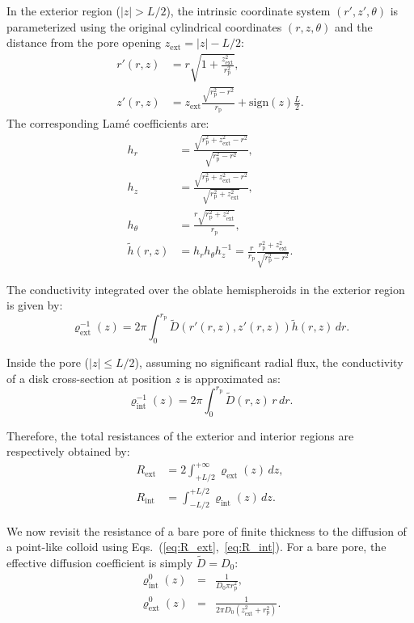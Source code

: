 \documentclass[10pt, a4paper, twocolumn]{article}
\begin{document}
In the exterior region ($|z| > L/2$), the intrinsic coordinate system $(r', z', \theta)$ is parameterized using the original cylindrical coordinates $(r,z,\theta)$ and the distance from the pore opening $z_{\text{ext}} = |z| - L/2$:
\begin{align}
    r'(r,z) &= r\sqrt{1 + \frac{z_{\text{ext}}^2}{r_{\text{p}}^2}},\\[4pt]
    z'(r,z) &= z_{\text{ext}}\frac{\sqrt{r_{\text{p}}^2 - r^2}}{r_{\text{p}}} + \text{sign}(z)\frac{L}{2}.
\end{align}
The corresponding Lam\'e  coefficients are:
\begin{align}
    h_r &= \frac{\sqrt{r_{\text{p}}^2 + z_{\text{ext}}^2 - r^2}}{\sqrt{r_{\text{p}}^2 - r^2}},\\[4pt]
    h_z &= \frac{\sqrt{r_{\text{p}}^2 + z_{\text{ext}}^2 - r^2}}{\sqrt{r_{\text{p}}^2 + z_{\text{ext}}^2}},\\[4pt]
    h_{\theta} &= \frac{r\sqrt{r_{\text{p}}^2 + z_{\text{ext}}^2}}{r_{\text{p}}},\\[4pt]
    \tilde{h}(r,z) &= h_r h_{\theta} h_z^{-1} = \frac{r}{r_{\text{p}}}\frac{r_{\text{p}}^2 + z_{\text{ext}}^2}{\sqrt{r_{\text{p}}^2 - r^2}}.
\end{align}

The conductivity integrated over the oblate hemispheroids in the exterior region is given by:
\begin{equation}
  \label{eq:rho_ext}
  \varrho_{\text{ext}}^{-1}(z)= 2\pi\int_{0}^{r_{\text{p}}^{}} 
  \tilde{D}\left( r'(r,z), z'(r,z) \right)\tilde{h}(r,z)\,dr.
\end{equation}

Inside the pore ($|z|\leq L/2$), assuming no significant radial flux, the conductivity of a disk cross-section at position $z$ is approximated as:
\begin{equation}
  \varrho_{\text{int}}^{-1}(z)= 2\pi\int_{0}^{r_{\text{p}}^{}} \tilde{D}(r,z)\,r\,dr.
\end{equation}

Therefore, the total resistances of the exterior and interior regions are respectively obtained by:
\begin{align}
   \label{eq:R_ext}
   R_{\text{ext}} &=2\int_{+L/2}^{+\infty}\varrho_{\text{ext}}(z)\,dz,\\[5pt]
   \label{eq:R_int}
   R_{\text{int}} &=\int_{-L/2}^{+L/2}\varrho_{\text{int}}(z)\,dz.
\end{align}

We now revisit the resistance of a bare pore of finite thickness to the diffusion of a point-like colloid using Eqs.~(\ref{eq:R_ext},~\ref{eq:R_int}).
For a bare pore, the effective diffusion coefficient is simply $\tilde{D} = D_0$:
\begin{eqnarray}
    \varrho^{0}_{\text{int}}(z) &=& \frac{1}{D_0 \pi r_{\text{p}}^2},\\[4pt]
    \varrho^{0}_{\text{ext}}(z) &=& \frac{1}{2\pi D_0\left(z_{\text{ext}}^2 + r_{\text{p}}^2\right)}.
\end{eqnarray}
\end{document}
